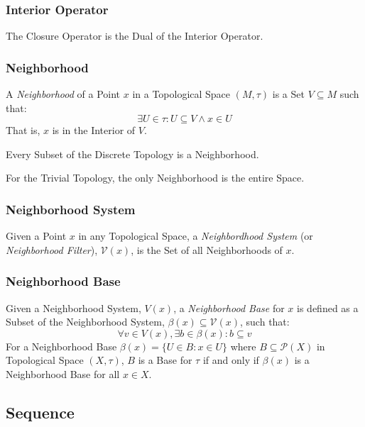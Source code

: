 \subsubsection{Interior Operator}\label{sec:interior_operator}

The Closure Operator is the Dual of the Interior Operator.



\subsubsection{Neighborhood}\label{sec:neighborhood}

A \emph{Neighborhood} of a Point $x$ in a Topological Space $(M,\tau)$
is a Set $V \subseteq M$ such that:
\[
    \exists U \in \tau : U \subseteq V \wedge x \in U
\]
That is, $x$ is in the Interior of $V$.

Every Subset of the Discrete Topology is a Neighborhood.

For the Trivial Topology, the only Neighborhood is the entire Space.



\subsubsection{Neighborhood System}\label{sec:neighborhood_system}

Given a Point $x$ in any Topological Space, a \emph{Neighbordhood
  System} (or \emph{Neighborhood Filter}), $\mathcal{V}(x)$, is the
Set of all Neighborhoods of $x$.



\subsubsection{Neighborhood Base}\label{sec:neighborhood_base}

Given a Neighborhood System, $V(x)$, a \emph{Neighborhood Base} for
$x$ is defined as a Subset of the Neighborhood System, $\beta(x)
\subseteq \mathcal{V}(x)$, such that:
\[
    \forall v \in V(x), \exists b \in \beta(x) : b \subseteq v
\]
For a Neighborhood Base $\beta(x) = \{ U \in B : x \in U \}$ where $B
\subseteq \mathcal{P}(X)$ in Topological Space $(X,\tau)$, $B$ is a
Base for $\tau$ if and only if $\beta(x)$ is a Neighborhood Base for
all $x \in X$.




\subsection{Sequence}\label{sec:topology_sequence}

